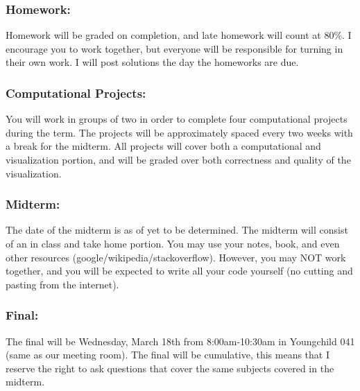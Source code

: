 \documentclass[10pt]{article}
\begin{document}
\subsubsection*{Homework:}
Homework will be graded on completion, and late homework will count at 80\%. I encourage you to work together, but everyone will be responsible for turning in their own work. I will post solutions the day the homeworks are due.

\subsubsection*{Computational Projects:}
You will work in groups of two in order to complete four computational projects during the term. The projects will be approximately spaced every two weeks with a break for the midterm. All projects will cover both a computational and visualization portion, and will be graded over both correctness and quality of the visualization.

\subsubsection*{Midterm:}
The date of the midterm is as of yet to be determined. The midterm will consist of an in class and take home portion. You may use your notes, book, and even other resources (google/wikipedia/stackoverflow). However, you may NOT work together, and you will be expected to write all your code yourself (no cutting and pasting from the internet).

\subsubsection*{Final:}
The final will be Wednesday, March 18th from 8:00am-10:30am in Youngchild 041 (same as our meeting room). The final will be cumulative, this means that I reserve the right to ask questions that cover the same subjects covered in the midterm.
\end{document}
